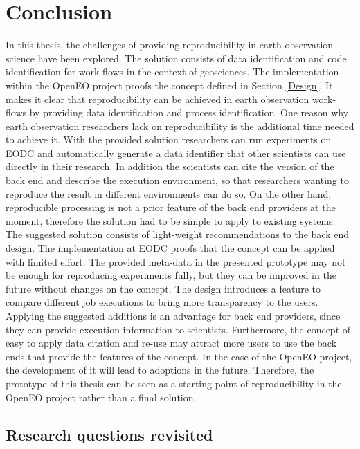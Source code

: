 \documentclass[draft,final]{vutinfth} %
\begin{document}
\section{Conclusion}

In this thesis, the challenges of providing reproducibility in earth observation science have been explored. The solution consists of data identification and code identification for work-flows in the context of geosciences. The implementation within the OpenEO project proofs the concept defined in Section \ref{Design}. It makes it clear that reproducibility can be achieved in earth observation work-flows by providing data identification and process identification. One reason why earth observation researchers lack on reproducibility is the additional time needed to achieve it. With the provided solution researchers can run experiments on EODC and automatically generate a data identifier that other scientists can use directly in their research. In addition the scientists can cite the version of the back end and describe the execution environment, so that researchers wanting to reproduce the result in different environments can do so. On the other hand, reproducible processing is not a prior feature of the back end providers at the moment, therefore the solution had to be simple to apply to existing systems. The suggested solution consists of light-weight recommendations to the back end design. The implementation at EODC proofs that the concept can be applied with limited effort. The provided meta-data in the presented prototype may not be enough for reproducing experiments fully, but they can be improved in the future without changes on the concept. The design introduces a feature to compare different job executions to bring more transparency to the users. Applying the suggested additions is an advantage for back end providers, since they can provide execution information to scientists. Furthermore, the concept of easy to apply data citation and re-use may attract more users to use the back ends that provide the features of the concept. In the case of the OpenEO project, the development of it will lead to adoptions in the future. Therefore, the prototype of this thesis can be seen as a starting point of reproducibility in the OpenEO project rather than a final solution.  

\subsection{Research questions revisited}\label{research question revisited}
\end{document}
